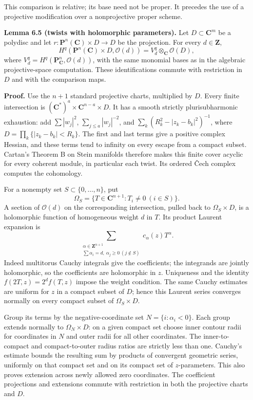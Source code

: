 \documentclass[11pt]{article}
\begin{document}
This comparison is relative; its base need not be proper. It precedes
the use of a projective modification over a nonprojective proper scheme.

\textbf{Lemma 6.5 (twists with holomorphic parameters).} Let
\(D\subset\mathbf C^m\) be a polydisc and let
\(r:\mathbf P^n(\mathbf C)\times D\to D\) be the projection. For every
\(d\in\mathbf Z\), \[
H^q(\mathbf P^n(\mathbf C)\times D,\mathcal O(d))
=V_d^q\otimes_{\mathbf C}\mathcal O(D),
\tag{7}
\] where \(V_d^q=H^q(\mathbf P^n_{\mathbf C},\mathcal O(d))\), with the
same monomial bases as in the algebraic projective-space computation.
These identifications commute with restriction in \(D\) and with the
comparison maps.

\textbf{Proof.} Use the \(n+1\) standard projective charts, multiplied
by \(D\). Every finite intersection is
\((\mathbf C^*)^a\times\mathbf C^{n-a}\times D\). It has a smooth
strictly plurisubharmonic exhaustion: add \(\sum|w_j|^2\),
\(\sum_{j\le a}|w_j|^{-2}\), and \(\sum_k(R_k^2-|z_k-b_k|^2)^{-1}\),
where \(D=\prod_k\{|z_k-b_k|<R_k\}\). The first and last terms give a
positive complex Hessian, and these terms tend to infinity on every
escape from a compact subset. Cartan's Theorem B on Stein manifolds
therefore makes this finite cover acyclic for every coherent module, in
particular each twist. Its ordered Čech complex computes the cohomology.

For a nonempty set \(S\subset\{0,\ldots,n\}\), put \[
\Omega_S=\{T\in\mathbf C^{n+1}:T_i\ne0\ (i\in S)\}.
\] A section of \(\mathcal O(d)\) on the corresponding intersection,
pulled back to \(\Omega_S\times D\), is a holomorphic function of
homogeneous weight \(d\) in \(T\). Its product Laurent expansion is \[
\sum_{\substack{\alpha\in\mathbf Z^{n+1}\\
\sum\alpha_i=d,\ \alpha_j\ge0\ (j\notin S)}}
c_\alpha(z)T^\alpha .
\tag{8}
\] Indeed multitorus Cauchy integrals give the coefficients; the
integrands are jointly holomorphic, so the coefficients are holomorphic
in \(z\). Uniqueness and the identity \(f(2T,z)=2^df(T,z)\) impose the
weight condition. The same Cauchy estimates are uniform for \(z\) in a
compact subset of \(D\); hence this Laurent series converges normally on
every compact subset of \(\Omega_S\times D\).

Group its terms by the negative-coordinate set \(N=\{i:\alpha_i<0\}\).
Each group extends normally to \(\Omega_N\times D\): on a given compact
set choose inner contour radii for coordinates in \(N\) and outer radii
for all other coordinates. The inner-to-compact and compact-to-outer
radius ratios are strictly less than one. Cauchy's estimate bounds the
resulting sum by products of convergent geometric series, uniformly on
that compact set and on its compact set of \(z\)-parameters. This also
proves extension across newly allowed zero coordinates. The coefficient
projections and extensions commute with restriction in both the
projective charts and \(D\).
\end{document}
